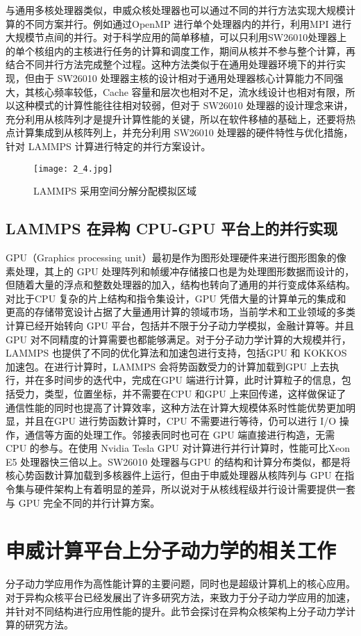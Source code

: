 与通用多核处理器类似，申威众核处理器也可以通过不同的并行方法实现大规模计算的不同方案并行。例如通过OpenMP 进行单个处理器内的并行，利用MPI 进行大规模节点间的并行。对于科学应用的简单移植，可以只利用SW26010处理器上的单个核组内的主核进行任务的计算和调度工作，期间从核并不参与整个计算，再结合不同并行方法完成整个过程。这种方法类似于在通用处理器环境下的并行实现，但由于 SW26010 处理器主核的设计相对于通用处理器核心计算能力不同强大，其核心频率较低，Cache 容量和层次也相对不足，流水线设计也相对有限，所以这种模式的计算性能往往相对较弱，但对于 SW26010 处理器的设计理念来讲，充分利用从核阵列才是提升计算性能的关键，所以在软件移植的基础上，还要将热点计算集成到从核阵列上，并充分利用 SW26010 处理器的硬件特性与优化措施，针对 LAMMPS 计算进行特定的并行方案设计。

 \begin{figure}[h]
  \centering
  \texttt{[image: 2\_4.jpg]}
  \caption{LAMMPS 采用空间分解分配模拟区域}
\end{figure}

\subsection{LAMMPS 在异构 CPU-GPU 平台上的并行实现}
GPU（Graphics processing unit）最初是作为图形处理硬件来进行图形图象的像素处理，其上的 GPU 处理阵列和帧缓冲存储接口也是为处理图形数据而设计的，但随着大量的浮点和整数处理器的加入，结构也转向了通用的并行变成体系结构。对比于CPU 复杂的片上结构和指令集设计，GPU 凭借大量的计算单元的集成和更高的存储带宽设计占据了大量通用计算的领域市场，当前学术和工业领域的多类计算已经开始转向 GPU 平台，包括并不限于分子动力学模拟，金融计算等。并且 GPU 对不同精度的计算需要也都能够满足。对于分子动力学计算的大规模并行，LAMMPS 也提供了不同的优化算法和加速包进行支持，包括GPU 和 KOKKOS 加速包。在进行计算时，LAMMPS 会将势函数受力的计算加载到GPU 上去执行，并在多时间步的迭代中，完成在GPU 端进行计算，此时计算粒子的信息，包括受力，类型，位置坐标，并不需要在CPU 和GPU 上来回传递，这样做保证了通信性能的同时也提高了计算效率，这种方法在计算大规模体系时性能优势更加明显，并且在GPU 进行势函数计算时，CPU 不需要进行等待，仍可以进行 I/O 操作，通信等方面的处理工作。邻接表同时也可在 GPU 端直接进行构造，无需 CPU 的参与。在使用 Nvidia Tesla GPU 对计算进行并行计算时，性能可比Xeon E5 处理器快三倍以上。SW26010 处理器与GPU 的结构和计算分布类似，都是将核心势函数计算加载到多核器件上运行，但由于申威处理器从核阵列与 GPU 在指令集与硬件架构上有着明显的差异，所以说对于从核线程级并行设计需要提供一套与 GPU 完全不同的并行计算方案。

\section{申威计算平台上分子动力学的相关工作}
分子动力学应用作为高性能计算的主要问题，同时也是超级计算机上的核心应用。对于异构众核平台已经发展出了许多研究方法，来致力于分子动力学应用的加速，并针对不同结构进行应用性能的提升。此节会探讨在异构众核架构上分子动力学计算的研究方法。

